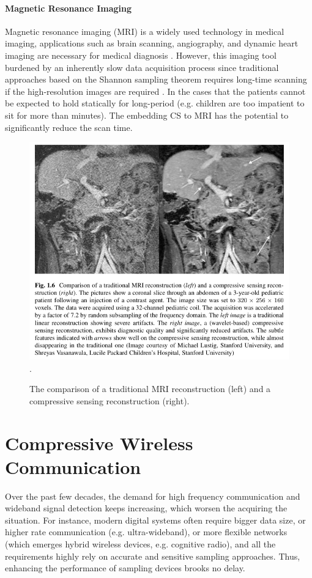 \paragraph{Magnetic Resonance Imaging}
Magnetic resonance imaging (MRI) is a widely used technology in medical imaging, applications such as brain scanning, angiography, and dynamic heart imaging are necessary for medical diagnosis \cite{foucart2013mathematical}. However, this imaging tool burdened by an inherently slow data acquisition process since traditional approaches based on the Shannon sampling theorem requires long-time scanning if the high-resolution images are required \cite{lustig2007sparse}. In the cases that the patients cannot be expected to hold statically for long-period (e.g. children are too impatient to sit for more than minutes). The embedding CS to MRI has the potential to significantly reduce the scan time. 

\begin{figure}
\label{I:cs-mri-intro}
\centering
\includegraphics[width=5.0in]{figs/cs-mri-intro.png}
\DeclareGraphicsExtensions.
\caption{The comparison of a traditional MRI reconstruction (left) and a compressive sensing reconstruction (right).}
\end{figure}

\section{Compressive Wireless Communication}
\indent	\indent Over the past few decades, the demand for high frequency communication and wideband signal detection keeps increasing, which worsen the acquiring the situation. For instance, modern digital systems often require bigger data size, or higher rate communication (e.g. ultra-wideband), or more flexible networks (which emerges hybrid wireless devices, e.g. cognitive radio), and all the requirements highly rely on accurate and sensitive sampling approaches. Thus, enhancing the performance of sampling devices brooks no delay. 

